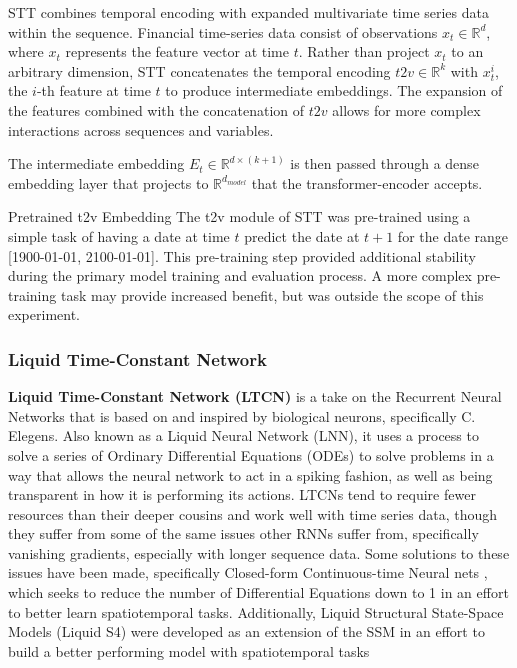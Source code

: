 \documentclass[10pt,twocolumn,letterpaper]{article}
\begin{document}
STT combines temporal encoding with expanded multivariate time series data within the sequence. Financial time-series data consist of observations $x_t \in \mathbb{R}^d$, where $x_t$ represents the feature vector at time $t$. Rather than project $x_t$ to an arbitrary dimension, STT concatenates the temporal encoding $t2v \in \mathbb{R}^k$ with $x^i_t$, the $i$-th feature at time $t$ to produce intermediate embeddings. The expansion of the features combined with the concatenation of $t2v$ allows for more complex interactions across sequences and variables.

            The intermediate embedding $E_t \in \mathbb{R}^{d \times (k + 1)}$ is then passed through a dense embedding layer that projects to $\mathbb{R}^{d_{model}}$ that the transformer-encoder accepts.

Pretrained t2v Embedding
The t2v module of STT was pre-trained using a simple task of having a date at time $t$ predict the date at $t+1$ for the date range [1900-01-01, 2100-01-01]. This pre-training step provided additional stability during the primary model training and evaluation process. A more complex pre-training task may provide increased benefit, but was outside the scope of this experiment.

\subsubsection{Liquid Time-Constant Network}

\textbf{Liquid Time-Constant Network (LTCN)} \cite{hasani_liquid_2020} is a take on the Recurrent Neural Networks that is based on and inspired by biological neurons, specifically C. Elegens. Also known as a Liquid Neural Network (LNN), it uses a process to solve a series of Ordinary Differential Equations (ODEs) to solve problems in a way that allows the neural network to act in a spiking fashion, as well as being transparent in how it is performing its actions. LTCNs tend to require fewer resources than their deeper cousins and work well with time series data, though they suffer from some of the same issues other RNNs suffer from, specifically vanishing gradients, especially with longer sequence data. Some solutions to these issues have been made, specifically Closed-form Continuous-time Neural nets \cite{CfC_LTC}, which seeks to reduce the number of Differential Equations down to 1 in an effort to better learn spatiotemporal tasks. Additionally, Liquid Structural State-Space Models (Liquid S4) were developed as an extension of the SSM in an effort to build a better performing model with spatiotemporal tasks \cite{hasani2022liquid}
\end{document}
